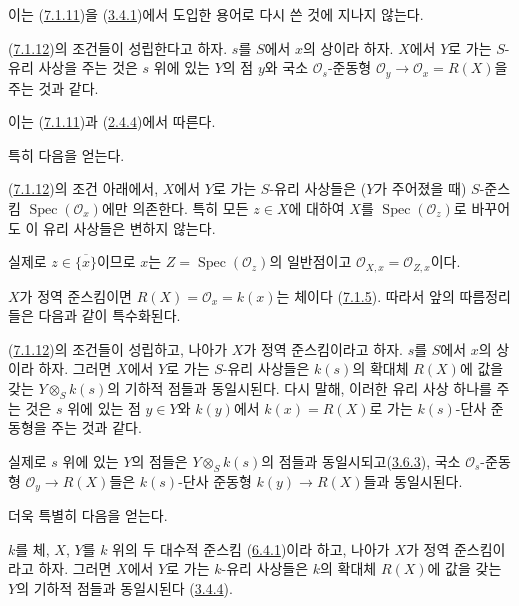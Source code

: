 이는 (\hyperref[I.7.1.11-ko]{7.1.11})을
(\hyperref[I.3.4.1-ko]{3.4.1})에서 도입한 용어로 다시 쓴 것에
지나지 않는다.

\begin{corollary}[7.1.13]
\label{I.7.1.13-ko}
(\hyperref[I.7.1.12-ko]{7.1.12})의 조건들이 성립한다고 하자.
$s$를 $S$에서 $x$의 상이라 하자. $X$에서 $Y$로 가는 $S$-유리
사상을 주는 것은 $s$ 위에 있는 $Y$의 점 $y$와 국소
$\mathscr{O}_s$-준동형
$\mathscr{O}_y\to\mathscr{O}_x=R(X)$을 주는 것과 같다.
\end{corollary}

이는 (\hyperref[I.7.1.11-ko]{7.1.11})과
(\hyperref[I.2.4.4-ko]{2.4.4})에서 따른다.

특히 다음을 얻는다.

\begin{corollary}[7.1.14]
\label{I.7.1.14-ko}
(\hyperref[I.7.1.12-ko]{7.1.12})의 조건 아래에서, $X$에서 $Y$로 가는
$S$-유리 사상들은 ($Y$가 주어졌을 때) $S$-준스킴
$\operatorname{Spec}(\mathscr{O}_x)$에만 의존한다. 특히 모든
$z\in X$에 대하여 $X$를 $\operatorname{Spec}(\mathscr{O}_z)$로
바꾸어도 이 유리 사상들은 변하지 않는다.
\end{corollary}

실제로 $z\in\overline{\{x\}}$이므로 $x$는
$Z=\operatorname{Spec}(\mathscr{O}_z)$의 일반점이고
$\mathscr{O}_{X,x}=\mathscr{O}_{Z,x}$이다.

$X$가 정역 준스킴이면 $R(X)=\mathscr{O}_x=k(x)$는 체이다
(\hyperref[I.7.1.5-ko]{7.1.5}). 따라서 앞의 따름정리들은 다음과 같이
특수화된다.

\begin{corollary}[7.1.15]
\label{I.7.1.15-ko}
(\hyperref[I.7.1.12-ko]{7.1.12})의 조건들이 성립하고, 나아가 $X$가
정역 준스킴이라고 하자. $s$를 $S$에서 $x$의 상이라 하자. 그러면 $X$에서
$Y$로 가는 $S$-유리 사상들은 $k(s)$의 확대체 $R(X)$에 값을 갖는
$Y\otimes_S k(s)$의 기하적 점들과 동일시된다. 다시 말해, 이러한
유리 사상 하나를 주는 것은 $s$ 위에 있는 점 $y\in Y$와
$k(y)$에서 $k(x)=R(X)$로 가는 $k(s)$-단사 준동형을 주는 것과 같다.
\end{corollary}

실제로 $s$ 위에 있는 $Y$의 점들은 $Y\otimes_S k(s)$의 점들과
동일시되고(\hyperref[I.3.6.3-ko]{3.6.3}), 국소
$\mathscr{O}_s$-준동형 $\mathscr{O}_y\to R(X)$들은
$k(s)$-단사 준동형 $k(y)\to R(X)$들과 동일시된다.

더욱 특별히 다음을 얻는다.

\begin{corollary}[7.1.16]
\label{I.7.1.16-ko}
$k$를 체, $X$, $Y$를 $k$ 위의 두 대수적 준스킴
(\hyperref[I.6.4.1-ko]{6.4.1})이라 하고, 나아가 $X$가 정역
준스킴이라고 하자. 그러면 $X$에서 $Y$로 가는 $k$-유리 사상들은 $k$의 확대체
$R(X)$에 값을 갖는 $Y$의 기하적 점들과 동일시된다
(\hyperref[I.3.4.4-ko]{3.4.4}).
\end{corollary}


